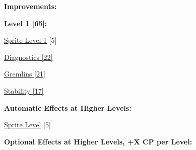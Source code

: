 \begin{multicols*}{3}
\textbf{ Improvements:}

\textbf{Level 1 [65]:}

\hyperref[sprite_level]{Sprite Level 1} [5]

\hyperref[diagnostics]{Diagnostics [22]}

\hyperref[gremlins]{Gremlins [21]}

\hyperref[stability]{Stability [17]}

\textbf{Automatic Effects at Higher Levels:}

\hyperref[sprite_level]{Sprite Level} [5]

\textbf{Optional Effects at Higher Levels, +X CP per Level:}

	
\end{multicols*}